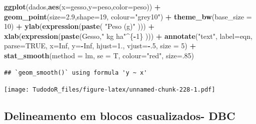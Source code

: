 \documentclass[
]{book}
\newenvironment{Shaded}{\begin{snugshade}}{\end{snugshade}}
\newcommand{\DataTypeTok}[1]{\textcolor[rgb]{0.13,0.29,0.53}{#1}}
\newcommand{\DecValTok}[1]{\textcolor[rgb]{0.00,0.00,0.81}{#1}}
\newcommand{\FloatTok}[1]{\textcolor[rgb]{0.00,0.00,0.81}{#1}}
\newcommand{\KeywordTok}[1]{\textcolor[rgb]{0.13,0.29,0.53}{\textbf{#1}}}
\newcommand{\NormalTok}[1]{#1}
\newcommand{\OperatorTok}[1]{\textcolor[rgb]{0.81,0.36,0.00}{\textbf{#1}}}
\newcommand{\OtherTok}[1]{\textcolor[rgb]{0.56,0.35,0.01}{#1}}
\newcommand{\StringTok}[1]{\textcolor[rgb]{0.31,0.60,0.02}{#1}}
\begin{document}
\begin{Shaded}
\begin{Highlighting}[]
\KeywordTok{ggplot}\NormalTok{(dados,}\KeywordTok{aes}\NormalTok{(}\DataTypeTok{x=}\NormalTok{gesso,}\DataTypeTok{y=}\NormalTok{peso,}\DataTypeTok{color=}\NormalTok{peso))  }\OperatorTok{+}\StringTok{ }
\StringTok{  }\KeywordTok{geom_point}\NormalTok{(}\DataTypeTok{size=}\FloatTok{2.9}\NormalTok{,}\DataTypeTok{shape=}\DecValTok{19}\NormalTok{, }\DataTypeTok{colour=}\StringTok{"grey10"}\NormalTok{) }\OperatorTok{+}\StringTok{ }
\StringTok{    }\KeywordTok{theme_bw}\NormalTok{(}\DataTypeTok{base_size =} \DecValTok{10}\NormalTok{) }\OperatorTok{+}\StringTok{ }
\StringTok{        }\KeywordTok{ylab}\NormalTok{(}\KeywordTok{expression}\NormalTok{(}\KeywordTok{paste}\NormalTok{(  }\StringTok{"Peso (g)"}\NormalTok{ )))  }\OperatorTok{+}\StringTok{ }
\StringTok{        }\KeywordTok{xlab}\NormalTok{(}\KeywordTok{expression}\NormalTok{(}\KeywordTok{paste}\NormalTok{(Gesso,}\StringTok{" kg ha"}\OperatorTok{^}\NormalTok{\{}\OperatorTok{-}\DecValTok{1}\NormalTok{\} )))  }\OperatorTok{+}\StringTok{ }
\StringTok{        }\KeywordTok{annotate}\NormalTok{(}\StringTok{"text"}\NormalTok{, }\DataTypeTok{label=}\NormalTok{eqn, }\DataTypeTok{parse=}\OtherTok{TRUE}\NormalTok{, }\DataTypeTok{x=}\OtherTok{Inf}\NormalTok{, }\DataTypeTok{y=}\OperatorTok{-}\OtherTok{Inf}\NormalTok{,}
             \DataTypeTok{hjust=}\FloatTok{1.}\NormalTok{, }\DataTypeTok{vjust=}\OperatorTok{-}\NormalTok{.}\DecValTok{5}\NormalTok{, }\DataTypeTok{size =} \DecValTok{5}\NormalTok{)  }\OperatorTok{+}\StringTok{    }
\StringTok{        }\KeywordTok{stat_smooth}\NormalTok{(}\DataTypeTok{method =}\NormalTok{ lm, }\DataTypeTok{se =}\NormalTok{ T, }\DataTypeTok{colour=}\StringTok{"red"}\NormalTok{, }\DataTypeTok{size=}\NormalTok{.}\DecValTok{85}\NormalTok{)}
\end{Highlighting}
\end{Shaded}

\begin{verbatim}
## `geom_smooth()` using formula 'y ~ x'
\end{verbatim}

\texttt{[image: TudodoR\_files/figure-latex/unnamed-chunk-228-1.pdf]}

\hypertarget{delineamento-em-blocos-casualizados--dbc}{%
\subsection{Delineamento em blocos casualizados- DBC}\label{delineamento-em-blocos-casualizados--dbc}}
\end{document}
